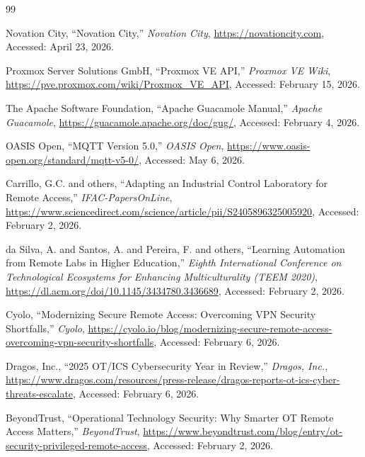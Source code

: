     \renewcommand{\bibname}{Webgraphy}

    \begin{thebibliography}{99}

Novation City, ``Novation City,'' \textit{Novation City}, \url{https://novationcity.com}, Accessed: April 23, 2026.

Proxmox Server Solutions GmbH, ``Proxmox VE API,'' \textit{Proxmox VE Wiki}, \url{https://pve.proxmox.com/wiki/Proxmox_VE_API}, Accessed: February 15, 2026.

The Apache Software Foundation, ``Apache Guacamole Manual,'' \textit{Apache Guacamole}, \url{https://guacamole.apache.org/doc/gug/}, Accessed: February 4, 2026.

OASIS Open, ``MQTT Version 5.0,'' \textit{OASIS Open}, \url{https://www.oasis-open.org/standard/mqtt-v5-0/}, Accessed: May 6, 2026.

Carrillo, G.C. and others, ``Adapting an Industrial Control Laboratory for Remote Access,'' \textit{IFAC-PapersOnLine}, \url{https://www.sciencedirect.com/science/article/pii/S2405896325005920}, Accessed: February 2, 2026.

da Silva, A. and Santos, A. and Pereira, F. and others, ``Learning Automation from Remote Labs in Higher Education,'' \textit{Eighth International Conference on Technological Ecosystems for Enhancing Multiculturality (TEEM 2020)}, \url{https://dl.acm.org/doi/10.1145/3434780.3436689}, Accessed: February 2, 2026.

Cyolo, ``Modernizing Secure Remote Access: Overcoming VPN Security Shortfalls,'' \textit{Cyolo}, \url{https://cyolo.io/blog/modernizing-secure-remote-access-overcoming-vpn-security-shortfalls}, Accessed: February 6, 2026.

Dragos, Inc., ``2025 OT/ICS Cybersecurity Year in Review,'' \textit{Dragos, Inc.}, \url{https://www.dragos.com/resources/press-release/dragos-reports-ot-ics-cyber-threats-escalate}, Accessed: February 6, 2026.

BeyondTrust, ``Operational Technology Security: Why Smarter OT Remote Access Matters,'' \textit{BeyondTrust}, \url{https://www.beyondtrust.com/blog/entry/ot-security-privileged-remote-access}, Accessed: February 2, 2026.


\end{thebibliography}
